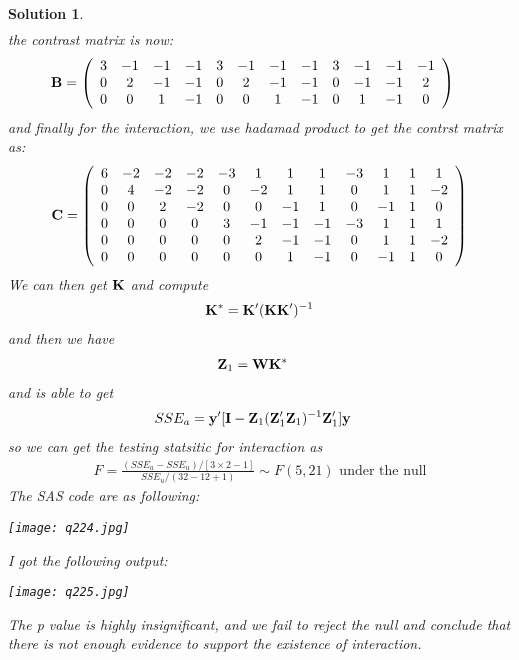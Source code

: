 \documentclass[11pt]{article}
\newtheorem{sol}{Solution}
\begin{document}
\begin{sol}
\begin{align*}
	\end{align*}
	the contrast matrix is now:
	\begin{align*}
		{\bf B} &= \left(\begin{array}{cccccccccccc} 3&-1&-1&-1&3&-1&-1&-1&3&-1&-1&-1\\ 0 &2&-1&-1&0&2&-1&-1&0&-1&-1&2\\ 0&0&1&-1&0&0&1&-1&0&1&-1&0\end{array}\right)
	\end{align*}
	and finally for the interaction, we use hadamad product to get the contrst matrix as:
	\begin{align*}
		{\bf C} = \left(\begin{array}{cccccccccccc} 6&-2&-2&-2&-3&1&1&1&-3&1&1&1\\  0&4&-2&-2&0&-2&1&1&0&1&1&-2\\  0&0&2&-2&0&0&-1&1&0&-1&1&0\\
		0&0&0&0&3&-1&-1&-1&-3&1&1&1\\  0&0&0&0&0&2&-1&-1&0&1&1&-2 \\  0&0&0&0&0&0&1&-1&0&-1&1&0\end{array}\right)
	\end{align*}
	We can then get ${\bf K}$ and compute
	\begin{align*}
			{\bf K}^{\ast} = {\bf K}'({\bf K}{\bf K}')^{-1}
	\end{align*}
	and then we have
	\begin{align*}
		{\bf Z}_1 &= {\bf W}{\bf K}^{\ast}
	\end{align*}
	and is able to get
	\begin{align*}
		SSE_a &= {\bf y}'[{\bf I} - {\bf Z}_1({\bf Z}_1'{\bf Z}_1)^{-1}{\bf Z}_1']{\bf y}
	\end{align*}
	so we can get the testing statsitic for interaction as
	\begin{align*}
		F = \frac{(SSE_a - SSE_u)/[3 \times 2 - 1]}{SSE_u/(32 - 12 + 1)} \sim F(5, 21) \text{ under the null}
	\end{align*}
	The SAS code are as following:
	\begin{center}
		\texttt{[image: q224.jpg]}
	\end{center}
	I got the following output:
	\begin{center}
		\texttt{[image: q225.jpg]}
	\end{center}
	The p value is highly insignificant, and we fail to reject the null and conclude that there is not enough evidence to support the existence of interaction.\vskip 2mm

\end{sol}
\end{document}
